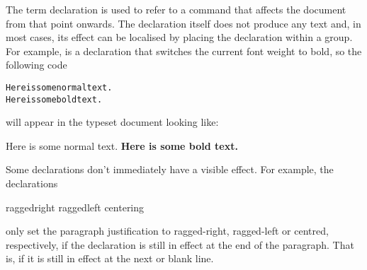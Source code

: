 The term \gls*{declaration} is used to refer to a \gls{command} that
affects the document from that point onwards. The declaration itself
does not produce any text and, in most cases, its effect can be
localised by placing the declaration within a \gls{group}. For
example,  is a declaration that switches the
current font weight to bold, so the following code
\begin{code}
\begin{alltt}
Here is some normal text.
 Here is some bold text.
\end{alltt}
\end{code}%
will appear in the typeset document looking like:
\begin{resultS}
Here is some normal text. \bfseries Here is some bold text.
\end{resultS}

Some declarations don't immediately have a visible effect. For
example, the declarations
\begin{definition}
\gls{raggedright}
\gls{raggedleft}
\gls{centering}
\end{definition}
only set the paragraph justification to ragged-right,
ragged-left or centred, respectively, if the
declaration is still in effect at the end of the paragraph.
That is, if it is still in effect at the next  or blank line.

